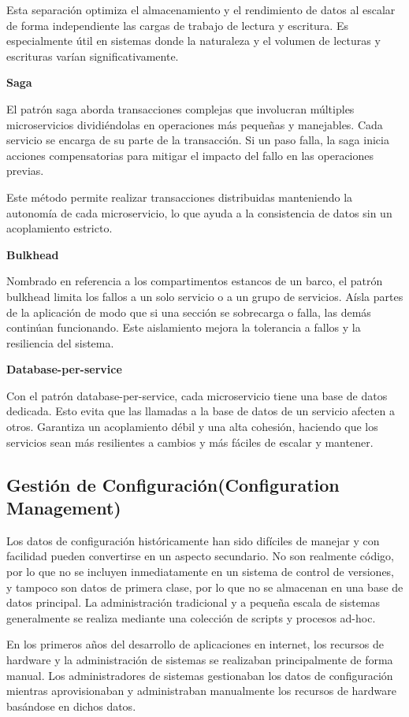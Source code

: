 \documentclass[12pt]{book}
\begin{document}
Esta separación optimiza el almacenamiento y el rendimiento de datos al escalar de forma independiente las cargas de trabajo de lectura y escritura. Es especialmente útil en sistemas donde la naturaleza y el volumen de lecturas y escrituras varían significativamente.

\textbf{Saga}

El patrón saga aborda transacciones complejas que involucran múltiples microservicios dividiéndolas en operaciones más pequeñas y manejables. Cada servicio se encarga de su parte de la transacción. Si un paso falla, la saga inicia acciones compensatorias para mitigar el impacto del fallo en las operaciones previas. 

Este método permite realizar transacciones distribuidas manteniendo la autonomía de cada microservicio, lo que ayuda a la consistencia de datos sin un acoplamiento estricto.

\textbf{Bulkhead}

Nombrado en referencia a los compartimentos estancos de un barco, el patrón bulkhead limita los fallos a un solo servicio o a un grupo de servicios. Aísla partes de la aplicación de modo que si una sección se sobrecarga o falla, las demás continúan funcionando. Este aislamiento mejora la tolerancia a fallos y la resiliencia del sistema.

\textbf{Database-per-service}

Con el patrón database-per-service, cada microservicio tiene una base de datos dedicada. Esto evita que las llamadas a la base de datos de un servicio afecten a otros. Garantiza un acoplamiento débil y una alta cohesión, haciendo que los servicios sean más resilientes a cambios y más fáciles de escalar y mantener.

\subsection{Gestión de Configuración(Configuration Management)}

Los datos de configuración históricamente han sido difíciles de manejar y con facilidad pueden convertirse en un aspecto secundario. No son realmente código, por lo que no se incluyen inmediatamente en un sistema de control de versiones, y tampoco son datos de primera clase, por lo que no se almacenan en una base de datos principal. La administración tradicional y a pequeña escala de sistemas generalmente se realiza mediante una colección de scripts y procesos ad-hoc.

En los primeros años del desarrollo de aplicaciones en internet, los recursos de hardware y la administración de sistemas se realizaban principalmente de forma manual. Los administradores de sistemas gestionaban los datos de configuración mientras aprovisionaban y administraban manualmente los recursos de hardware basándose en dichos datos.
\end{document}
